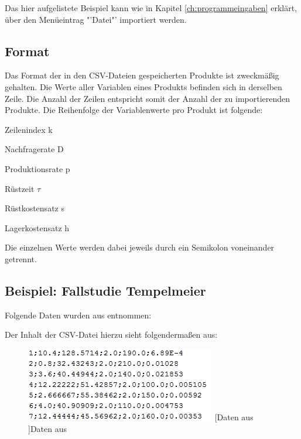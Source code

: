 Das hier aufgelistete Beispiel kann wie in Kapitel \ref{ch:programmeingaben} erklärt, über den Menüeintrag "'Datei"' importiert werden.

\subsection{Format}
Das Format der in den CSV-Dateien gespeicherten Produkte ist zweckmäßig gehalten. Die Werte aller Variablen eines Produkts befinden sich in derselben Zeile. Die Anzahl der Zeilen entspricht somit der Anzahl der zu importierenden Produkte. Die Reihenfolge der Variablenwerte pro Produkt ist folgende:
\begin{compactitem}
	\item Zeilenindex k
	\item Nachfragerate D
	\item Produktionsrate p
	\item Rüstzeit $\tau$
	\item Rüstkostensatz s
	\item Lagerkostensatz h
\end{compactitem}
Die einzelnen Werte werden dabei jeweils durch ein Semikolon voneinander getrennt.

\subsection{Beispiel: Fallstudie Tempelmeier}
Folgende Daten wurden aus \cite{Templ09} entnommen:

Der Inhalt der CSV-Datei hierzu sieht folgendermaßen aus:
\begin{figure}[H]
	\centering
	\includegraphics[width=0.5\linewidth]{Bilder/Export.png} 
	[Daten aus \cite{Templ09}]{Daten aus \cite{Templ09}}
	\label{fig:export}
\end{figure}
